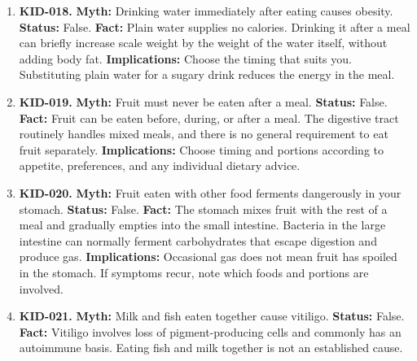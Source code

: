 \documentclass[11pt,oneside]{book}
\begin{document}
\begin{enumerate}[leftmargin=0pt,labelwidth=0pt,labelsep=0pt,itemindent=0pt]
\textbf{Fact:} Drinking water with a meal does not dilute digestive juices enough to impair ordinary digestion. Water helps with swallowing and moving food through the digestive tract. \cite{ref349}\newline
\textbf{Implications:} Drink with meals if comfortable, within any fluid limit prescribed for a medical condition.
\item[] \textbf{KID-018.} \textbf{Myth:} Drinking water immediately after eating causes obesity.\newline
\textbf{Status:} False.\newline
\textbf{Fact:} Plain water supplies no calories. Drinking it after a meal can briefly increase scale weight by the weight of the water itself, without adding body fat. \cite{ref349}\newline
\textbf{Implications:} Choose the timing that suits you. Substituting plain water for a sugary drink reduces the energy in the meal.
\item[] \textbf{KID-019.} \textbf{Myth:} Fruit must never be eaten after a meal.\newline
\textbf{Status:} False.\newline
\textbf{Fact:} Fruit can be eaten before, during, or after a meal. The digestive tract routinely handles mixed meals, and there is no general requirement to eat fruit separately. \cite{ref209}\newline
\textbf{Implications:} Choose timing and portions according to appetite, preferences, and any individual dietary advice.
\item[] \textbf{KID-020.} \textbf{Myth:} Fruit eaten with other food ferments dangerously in your stomach.\newline
\textbf{Status:} False.\newline
\textbf{Fact:} The stomach mixes fruit with the rest of a meal and gradually empties into the small intestine. Bacteria in the large intestine can normally ferment carbohydrates that escape digestion and produce gas. \cite{ref209,ref350}\newline
\textbf{Implications:} Occasional gas does not mean fruit has spoiled in the stomach. If symptoms recur, note which foods and portions are involved.
\item[] \textbf{KID-021.} \textbf{Myth:} Milk and fish eaten together cause vitiligo.\newline
\textbf{Status:} False.\newline
\textbf{Fact:} Vitiligo involves loss of pigment-producing cells and commonly has an autoimmune basis. Eating fish and milk together is not an established cause. \cite{ref351}\newline

\end{enumerate}
\end{document}
